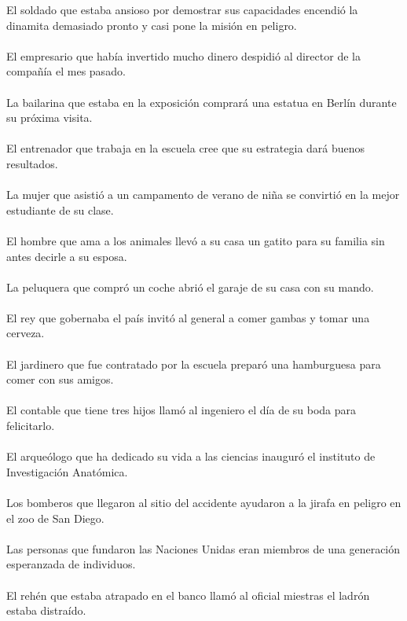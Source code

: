 El soldado que estaba ansioso por demostrar sus capacidades encendi\'{o} la dinamita demasiado pronto y casi pone la misi\'{o}n en peligro.	\\	\\
El  empresario que hab\'{i}a invertido mucho dinero despidi\'{o} al director de la compa\~{n}\'{i}a el mes pasado.	\\	\\
La bailarina que estaba en la exposici\'{o}n comprar\'{a} una estatua en Berl\'{i}n durante su pr\'{o}xima visita.	\\	\\
El entrenador que trabaja en la escuela cree que su estrategia dar\'{a} buenos resultados.	\\	\\
La mujer que asisti\'{o} a un campamento de verano de ni\~{n}a se convirti\'{o} en la mejor estudiante de su clase.	\\	\\
El hombre que ama a los animales llev\'{o} a su casa un gatito para su familia sin antes decirle a su esposa.	\\	\\
La peluquera que compr\'{o} un coche abri\'{o} el garaje de su casa con su mando.	\\	\\
El rey que gobernaba el pa\'{i}s invit\'{o} al general a comer gambas y tomar una cerveza.	\\	\\
El jardinero que fue contratado por la escuela prepar\'{o} una hamburguesa para comer con sus amigos.	\\	\\
El contable que tiene tres hijos llam\'{o} al ingeniero el d\'{i}a de su boda para felicitarlo.	\\	\\
El arque\'{o}logo que ha dedicado su vida a las ciencias inaugur\'{o} el instituto de Investigaci\'{o}n Anat\'{o}mica.	\\	\\
Los bomberos que llegaron al sitio del accidente ayudaron a la jirafa en peligro en el zoo de San Diego.	\\	\\
Las personas que fundaron las Naciones Unidas eran miembros de una generaci\'{o}n esperanzada de individuos.	\\	\\
El rehén que estaba atrapado en el banco llam\'{o} al oficial miestras el ladr\'{o}n estaba distra\'{i}do.	\\	\\
